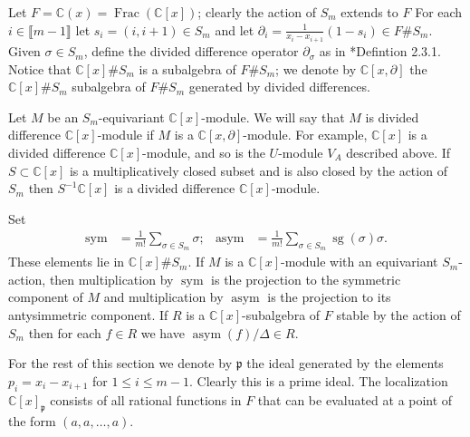 \documentclass[11pt,fleqn]{article}
\newcommand\CC{\mathbb C}
\newcommand\p{\mathfrak p}
\newcommand\interval[1]{\llbracket #1 \rrbracket}
\DeclareMathOperator\sym{sym}
\DeclareMathOperator\asym{asym}
\DeclareMathOperator\sg{sg}
\DeclareMathOperator\Frac{Frac}
\begin{document}
Let $F = \CC(x) = \Frac(\CC[x])$; clearly the action of $S_m$ extends to $F$
For each $i \in \interval{m-1}$ let $s_i = (i,i+1) \in S_m$ and let $\partial_i
= \frac{1}{x_i - x_{i+1}}(1 - s_i) \in F \# S_m$. Given $\sigma \in 
S_m$, define the divided difference operator $\partial_\sigma$ as in 
\cite{Man-symm-book}*{Defintion 2.3.1}. Notice that $\CC[x] \# S_m$ is a 
subalgebra of $F \# S_m$; we denote by $\CC[x, \partial]$ the $\CC[x] \# S_m$
subalgebra of $F \# S_m$ generated by divided differences.

Let $M$ be an $S_m$-equivariant $\CC[x]$-module. We will say that $M$ is 
divided difference $\CC[x]$-module if $M$ is a $\CC[x,\partial]$-module.
For example, $\CC[x]$ is a divided difference $\CC[x]$-module, and so is the
$U$-module $V_A$ described above. If $S \subset \CC[x]$ is a multiplicatively
closed subset and is also closed by the action of $S_m$ then $S^{-1}\CC[x]$
is a divided difference $\CC[x]$-module.

Set
\begin{align*}
\sym 
  &= \frac{1}{m!}\sum_{\sigma \in S_m} \sigma; 
  &\asym 
  &= \frac{1}{m!}\sum_{\sigma \in S_m} \sg(\sigma) \sigma.
\end{align*}
These elements lie in $\CC[x] \# S_m$. If $M$ is a $\CC[x]$-module with an 
equivariant $S_m$-action, then multiplication by $\sym$ is the projection to 
the symmetric component of $M$ and multiplication by $\asym$ is the projection
to its antysimmetric component. If $R$ is a $\CC[x]$-subalgebra of $F$ stable 
by the action of $S_m$ then for each $f \in R$ we have $\asym(f)/\Delta \in R$.

For the rest of this section we denote by $\p$ the ideal generated by the 
elements $p_i = x_i - x_{i+1}$ for $1 \leq i \leq m-1$. Clearly this is a prime
ideal. The localization $\CC[x]_\p$ consists of all rational functions in $F$
that can be evaluated at a point of the form $(a,a, \ldots, a)$.
\end{document}
